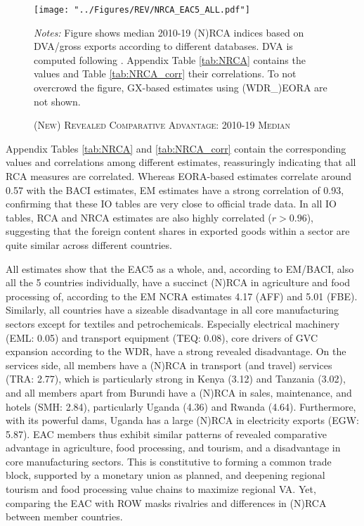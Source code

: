 \documentclass[a4paper]{article}
\begin{document}
\begin{figure}[h!] 
\centering
\caption{\label{fig:NRCA}\textsc{(New) Revealed Comparative Advantage: 2010-19 Median}}
\texttt{[image: "../Figures/REV/NRCA\_EAC5\_ALL.pdf"]} \\
\raggedright
\scriptsize
\emph{Notes:} Figure shows median 2010-19 (N)RCA indices based on DVA/gross exports according to different databases. DVA is computed following \citet{borin2019measuring}. Appendix Table \ref{tab:NRCA} contains the values and Table \ref{tab:NRCA_corr} their correlations. To not overcrowd the figure, GX-based estimates using (WDR\_)EORA are not shown. 
\end{figure}
\FloatBarrier

Appendix Tables \ref{tab:NRCA} and \ref{tab:NRCA_corr} contain the corresponding values and correlations among different estimates, reassuringly indicating that all RCA measures are correlated. Whereas EORA-based estimates correlate around 0.57 with the BACI estimates, EM estimates have a strong correlation of 0.93, confirming that these IO tables are very close to official trade data. In all IO tables, RCA and NRCA estimates are also highly correlated ($r > 0.96$), suggesting that the foreign content shares in exported goods within a sector are quite similar across different countries. \newline

All estimates show that the EAC5 as a whole, and, according to EM/BACI, also all the 5 countries individually, have a succinct (N)RCA in agriculture and food processing of, according to the EM NCRA estimates 4.17 (AFF) and 5.01 (FBE). Similarly, all countries have a sizeable disadvantage in all core manufacturing sectors except for textiles and petrochemicals. Especially electrical machinery (EML: 0.05) and transport equipment (TEQ: 0.08), core drivers of GVC expansion according to the WDR, have a strong revealed disadvantage. On the services side, all members have a (N)RCA in transport (and travel) services (TRA: 2.77), which is particularly strong in Kenya (3.12) and Tanzania (3.02), and all members apart from Burundi have a (N)RCA in sales, maintenance, and hotels (SMH: 2.84), particularly Uganda (4.36) and Rwanda (4.64). Furthermore, with its powerful dams, Uganda has a large (N)RCA in electricity exports (EGW: 5.87). EAC members thus exhibit similar patterns of revealed comparative advantage in agriculture, food processing, and tourism, and a disadvantage in core manufacturing sectors. This is constitutive to forming a common trade block, supported by a monetary union as planned, and deepening regional tourism and food processing value chains to maximize regional VA. Yet, comparing the EAC with ROW masks rivalries and differences in (N)RCA between member countries. 
\end{document}

